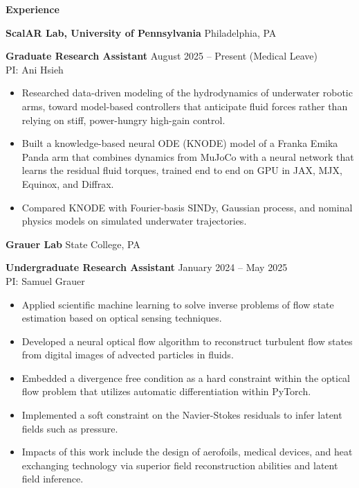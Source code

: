 \begin{center}
    \textbf{Experience}
\end{center}
\textbf{ScalAR Lab, University of Pennsylvania} \hfill Philadelphia, PA

\textbf{Graduate Research Assistant} \hfill August 2025 -- Present (Medical Leave)\\
PI: Ani Hsieh
\begin{itemize}[noitemsep, topsep=0pt, partopsep=0pt, parsep=0pt]
    \item Researched data-driven modeling of the hydrodynamics of underwater robotic arms, toward model-based controllers that anticipate fluid forces rather than relying on stiff, power-hungry high-gain control.

    \item Built a knowledge-based neural ODE (KNODE) model of a Franka Emika Panda arm that combines dynamics from MuJoCo with a neural network that learns the residual fluid torques, trained end to end on GPU in JAX, MJX, Equinox, and Diffrax.

    \item Compared KNODE with Fourier-basis SINDy, Gaussian process, and nominal physics models on simulated underwater trajectories.
\end{itemize}

\vspace{12pt}

\textbf{Grauer Lab} \hfill State College, PA

\textbf{Undergraduate Research Assistant} \hfill January 2024 – May 2025\\
PI: Samuel Grauer
\begin{itemize}[noitemsep, topsep=0pt, partopsep=0pt, parsep=0pt]
    \item Applied scientific machine learning to solve inverse problems of flow state estimation based on optical sensing techniques.
    
    \item Developed a neural optical flow algorithm to reconstruct turbulent flow states from digital images of advected particles in fluids.

    \item Embedded a divergence free condition as a hard constraint within the optical flow problem that utilizes automatic differentiation within PyTorch.

    \item Implemented a soft constraint on the Navier-Stokes residuals to infer latent fields such as pressure.

    \item Impacts of this work include the design of aerofoils, medical devices, and heat exchanging technology via superior field reconstruction abilities and latent field inference.
    
    
\end{itemize}

